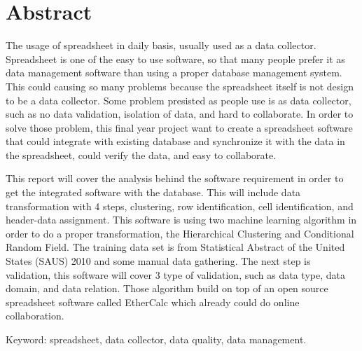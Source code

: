 \clearpage
\chapter*{Abstract}

The usage of spreadsheet in daily basis, usually used as a data collector. Spreadsheet is one of the easy to use software, so that many people prefer it as data management software than using a proper database management system. This could causing so many problems because the spreadsheet itself is not design to be a data collector. Some problem presisted as people use is as data collector, such as no data validation, isolation of data, and hard to collaborate. In order to solve those problem, this final year project want to create a spreadsheet software that could integrate with existing database and synchronize it with the data in the spreadsheet, could verify the data, and easy to collaborate.

This report will cover the analysis behind the software requirement in order to get the integrated software with the database. This will include data transformation with 4 steps, clustering, row identification, cell identification, and header-data assignment. This software is using two machine learning algorithm in order to do a proper transformation, the Hierarchical Clustering and Conditional Random Field. The training data set is from Statistical Abstract of the United States (SAUS) 2010 and some manual data gathering. The next step is validation, this software will cover 3 type of validation, such as data type, data domain, and data relation. Those algorithm build on top of an open source spreadsheet software called EtherCalc which already could do online collaboration.

\vspace{15mm}
Keyword: spreadsheet, data collector, data quality, data management.
\clearpage